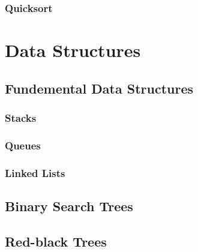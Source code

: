 \documentclass{concrete-book}
\begin{document}
\section{Quicksort}

\part{Data Structures}

\chapter{Fundemental Data Structures}
\section{Stacks}
\section{Queues}
\section{Linked Lists}

\chapter{Binary Search Trees}
\chapter{Red-black Trees}
\end{document}

